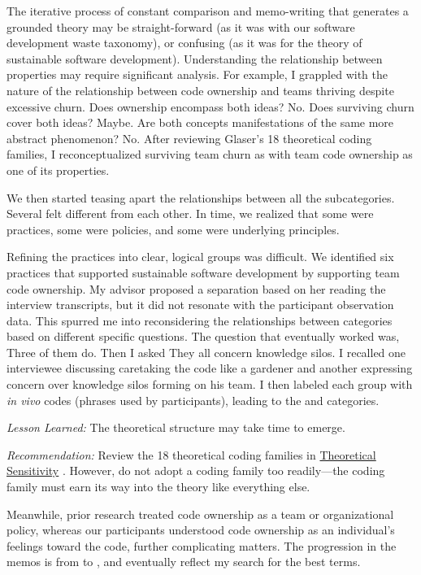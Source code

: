 The iterative process of constant comparison and memo-writing that generates a grounded theory may be straight-forward (as it was with our software development waste taxonomy), or confusing (as it was for the theory of sustainable software development). Understanding the relationship between properties may require significant analysis. For example, I grappled with the nature of the relationship between code ownership and teams thriving despite excessive churn. Does ownership encompass both ideas? No. Does surviving churn cover both ideas? Maybe. Are both concepts manifestations of the same more abstract phenomenon? No. After reviewing Glaser's 18 theoretical coding families, I reconceptualized surviving team churn as  with team code ownership as one of its properties. 

We then started teasing apart the relationships between all the subcategories. Several felt different from each other. In time, we realized that some were practices, some were policies, and some were underlying principles. 

Refining the practices into clear, logical groups was difficult. We identified six practices that supported sustainable software development by supporting team code ownership. My advisor proposed a separation based on her reading the interview transcripts, but it did not resonate with the participant observation data. This spurred me into reconsidering the relationships between categories based on different specific questions. The question that eventually worked was,  Three of them do. Then I asked  They all concern knowledge silos. I recalled one interviewee discussing caretaking the code like a gardener and another expressing concern over knowledge silos forming on his team. I then labeled each group with \textit{in vivo} codes (phrases used by participants), leading to the  and  categories. 

\textit{Lesson Learned:} The theoretical structure may take time to emerge.

\textit{Recommendation:} Review the 18 theoretical coding families in \underline{Theoretical Sensitivity} \cite{GlaserTheoreticalSensitivity}. However, do not adopt a coding family too readily---the coding family must earn its way into the theory like everything else.

Meanwhile, prior research treated code ownership as a team or organizational policy, whereas  our participants understood code ownership as an individual's feelings toward the code, further complicating matters. The progression in the memos is from  to ,  and eventually   reflect my search for the best terms.

